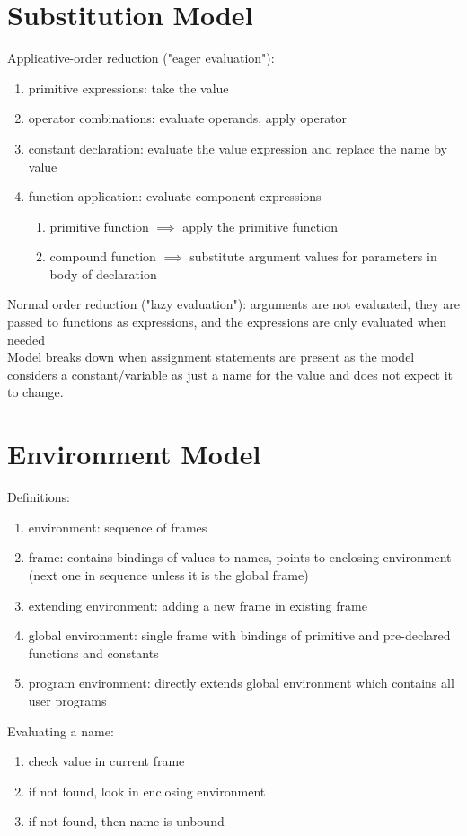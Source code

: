 \documentclass[landscape, a4paper]{article}
\newcommand{\customsection}[1]{
    \vspace{-5pt}
    \section*{#1}
    \vspace{-4pt}
}
\begin{document}
\begin{multicols*}{4}
  \customsection{Substitution Model}
  Applicative-order reduction ("eager evaluation"):
  \begin{enumerate}
    \item primitive expressions: take the value
    \item operator combinations: evaluate operands, apply operator
    \item constant declaration: evaluate the value expression and replace the name by value
    \item function application: evaluate component expressions
          \begin{enumerate}
            \item primitive function $\implies$ apply the primitive function
            \item compound function $\implies$ substitute argument values for parameters in body of declaration
          \end{enumerate}
  \end{enumerate}
  Normal order reduction ("lazy evaluation"): arguments are not evaluated, they are passed to functions as expressions, and the expressions are only evaluated when needed\\
  Model breaks down when assignment statements are present as the model considers a constant/variable as just a name for the value and does not expect it to change.
  \customsection{Environment Model}
  Definitions:
  \begin{enumerate}
    \item environment: sequence of frames
    \item frame: contains bindings of values to names, points to enclosing environment (next one in sequence unless it is the global frame)
    \item extending environment: adding a new frame in existing frame
    \item global environment: single frame with bindings of primitive and pre-declared functions and constants
    \item program environment: directly extends global environment which contains all user programs
  \end{enumerate}
  Evaluating a name:
  \begin{enumerate}
    \item check value in current frame
    \item if not found, look in enclosing environment
    \item if not found, then name is unbound
  \end{enumerate}

\end{multicols*}
\end{document}
